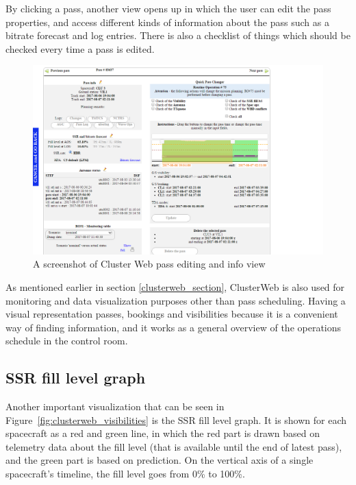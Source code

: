By clicking a pass, another view opens up in which the user can edit the pass properties, and access different kinds of information about the pass such as a bitrate forecast and log entries. There is also a checklist of things which should be checked every time a pass is edited.

\begin{figure}[ht]
  \begin{center}
    \includegraphics*[width=1\textwidth]{clusterweb_pass_edit}
  \end{center}
  \caption{A screenshot of Cluster Web pass editing and info view}
  \label{fig:clusterweb_pass_edit}
\end{figure}

As mentioned earlier in section \ref{clusterweb_section}, ClusterWeb is also used for monitoring and data visualization purposes other than pass scheduling. Having a visual representation passes, bookings and visibilities because it is a convenient way of finding information, and it works as a general overview of the operations schedule in the control room.

\subsection{SSR fill level graph}
Another important visualization that can be seen in Figure~\ref{fig:clusterweb_visibilities} is the SSR fill level graph. It is shown for each spacecraft as a red and green line, in which the red part is drawn based on telemetry data about the fill level (that is available until the end of latest pass), and the green part is based on prediction. On the vertical axis of a single spacecraft's timeline, the fill level goes from 0\% to 100\%.

